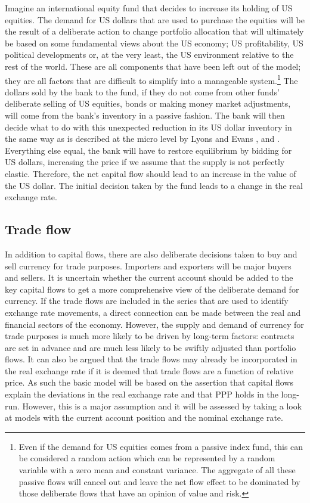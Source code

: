 \documentclass[12pt, a4paper, oneside]{article}\usepackage[]{graphicx}\usepackage[]{color}
\begin{document}
Imagine an international equity fund that decides to increase its holding of US equities.  The demand for US dollars that are used to purchase the equities will be the result of a deliberate action to change portfolio allocation that will ultimately be based on some fundamental views about the US economy; US profitability, US political developments or, at the very least, the US environment relative to the rest of the world.  These are all components that have been left out of the model; they are all factors that are difficult to simplify into a manageable system.\footnote{Even if the demand for US equities comes from a passive index fund, this can be considered a random action which can be represented by a random variable with a zero mean and constant variance.  The aggregate of all these passive flows will cancel out and leave the net flow effect to be dominated by those deliberate flows that have an opinion of value and risk.}  The dollars sold by the bank to the fund, if they do not come from other funds' deliberate selling of US equities, bonds or making money market adjustments, will come from the bank's inventory in a passive fashion.  The bank will then decide what to do with this unexpected reduction in its US dollar inventory in the same way as is described at the micro level by Lyons and Evans \citep{Evans2002Order}, \citep{Lyons1995Microstructure} and \citep{Lyons2006Microstructure}.  Everything else equal, the bank will have to restore equilibrium by bidding for US dollars, increasing the price if we assume that the supply is not perfectly elastic.  Therefore, the net capital flow should lead to an increase in the value of the US dollar. The initial decision taken by the fund leads to a change in the real exchange rate.  %

\subsection{Trade flow}
In addition to capital flows, there are also deliberate decisions taken to buy and sell currency for trade purposes.   Importers and exporters will be major buyers and sellers.  It is uncertain whether the current account should be added to the key capital flows to get a more comprehensive view of the deliberate demand for currency.  If the trade flows are included in the series that are used to identify exchange rate movements, a direct connection can be made between the real and financial sectors of the economy.  However, the supply and demand of currency for trade purposes is much more likely to be driven by long-term factors:  contracts are set in advance and are much less likely to be swiftly adjusted than portfolio flows.   It can also be argued that the trade flows may already be incorporated in the real exchange rate if it is deemed that trade flows are a function of relative price.  As such the basic model will be based on the assertion that capital flows explain the deviations in the real exchange rate and that PPP holds in the long-run.  However, this is a major assumption and it will be assessed by taking a look at models with the current account position and the nominal exchange rate.  
\end{document}
